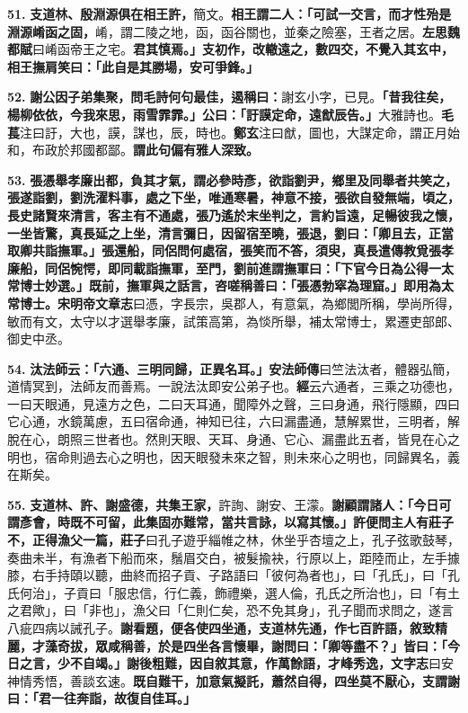 \textbf{51.} \textbf{支道林、殷淵源俱在相王許，}{\footnotesize 簡文。}\textbf{相王謂二人：「可試一交言，而才性殆是淵源崤函之固，}{\footnotesize 崤，謂二陵之地，函，函谷關也，並秦之險塞，王者之居。\textbf{左思魏都賦}曰崤函帝王之宅。}\textbf{君其慎焉。」支初作，改轍遠之，數四交，不覺入其玄中，相王撫肩笑曰：「此自是其勝場，安可爭鋒。」}

\textbf{52.} \textbf{謝公因子弟集聚，問毛詩何句最佳，遏稱曰：}{\footnotesize 謝玄小字，已見。}\textbf{「昔我往矣，楊柳依依，今我來思，雨雪霏霏。」公曰：「訏謨定命，遠猷辰告。」}{\footnotesize 大雅詩也。\textbf{毛萇}注曰訏，大也，謨，謀也，辰，時也。\textbf{鄭玄}注曰猷，圖也，大謀定命，謂正月始和，布政於邦國都鄙。}\textbf{謂此句偏有雅人深致。}

\textbf{53.} \textbf{張憑舉孝廉出都，負其才氣，謂必參時彥，欲詣劉尹，鄉里及同舉者共笑之，張遂詣劉，劉洗濯料事，處之下坐，唯通寒暑，神意不接，張欲自發無端，頃之，長史諸賢來清言，客主有不通處，張乃遙於末坐判之，言約旨遠，足暢彼我之懷，一坐皆驚，真長延之上坐，清言彌日，因留宿至曉，張退，劉曰：「卿且去，正當取卿共詣撫軍。」張還船，同侶問何處宿，張笑而不答，須臾，真長遣傳教覓張孝廉船，同侶惋愕，即同載詣撫軍，至門，劉前進謂撫軍曰：「下官今日為公得一太常博士妙選。」既前，撫軍與之話言，咨嗟稱善曰：「張憑勃窣為理窟。」即用為太常博士。}{\footnotesize \textbf{宋明帝文章志}曰憑，字長宗，吳郡人，有意氣，為鄉閭所稱，學尚所得，敏而有文，太守以才選舉孝廉，試策高第，為惔所舉，補太常博士，累遷吏部郎、御史中丞。}

\textbf{54.} \textbf{汰法師云：「六通、三明同歸，正異名耳。」}{\footnotesize \textbf{安法師傳}曰竺法汰者，體器弘簡，道情冥到，法師友而善焉。一說法汰即安公弟子也。\textbf{經}云六通者，三乘之功德也，一曰天眼通，見遠方之色，二曰天耳通，聞障外之聲，三曰身通，飛行隱顯，四曰它心通，水鏡萬慮，五曰宿命通，神知已往，六曰漏盡通，慧解累世，三明者，解脫在心，朗照三世者也。然則天眼、天耳、身通、它心、漏盡此五者，皆見在心之明也，宿命則過去心之明也，因天眼發未來之智，則未來心之明也，同歸異名，義在斯矣。}

\textbf{55.} \textbf{支道林、許、謝盛德，共集王家，}{\footnotesize 許詢、謝安、王濛。}\textbf{謝顧謂諸人：「今日可謂彥會，時既不可留，此集固亦難常，當共言詠，以寫其懷。」許便問主人有莊子不，正得漁父一篇，}{\footnotesize \textbf{莊子}曰孔子遊乎緇帷之林，休坐乎杏壇之上，孔子弦歌鼓琴，奏曲未半，有漁者下船而來，鬚眉交白，被髮揄袂，行原以上，距陸而止，左手據膝，右手持頤以聽，曲終而招子貢、子路語曰「彼何為者也」，曰「孔氏」，曰「孔氏何治」，子貢曰「服忠信，行仁義，飾禮樂，選人倫，孔氏之所治也」，曰「有土之君歟」，曰「非也」，漁父曰「仁則仁矣，恐不免其身」，孔子聞而求問之，遂言八疵四病以誡孔子。}\textbf{謝看題，便各使四坐通，支道林先通，作七百許語，敘致精麗，才藻奇拔，眾咸稱善，於是四坐各言懷畢，謝問曰：「卿等盡不？」皆曰：「今日之言，少不自竭。」謝後粗難，因自敘其意，作萬餘語，才峰秀逸，}{\footnotesize \textbf{文字志}曰安神情秀悟，善談玄速。}\textbf{既自難干，加意氣擬託，蕭然自得，四坐莫不厭心，支謂謝曰：「君一往奔詣，故復自佳耳。」}

